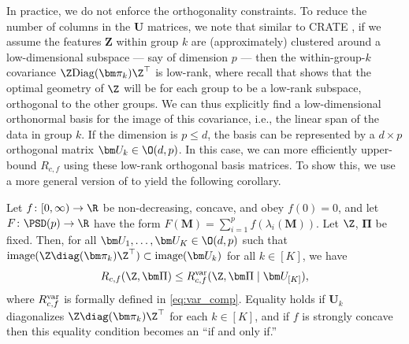 \documentclass[../../book-main.tex]{subfiles}
\begin{document}
In practice, we do not enforce the orthogonality constraints. To
reduce the number of columns in the $\bm U$ matrices, we note that
similar to CRATE \citep{yu2023white}, if we assume the features $\bm
Z$ within group \(k\) are (approximately) clustered around a
low-dimensional subspace --- say of dimension \(p\) --- then the
within-group-\(k\) covariance \(\Z\mathrm{Diag}(\bm
\pi_{k})\Z^{\top}\) is low-rank, where recall that
\cite{yu2020learning} shows that the optimal geometry of $\Z$ will be
for each group to be a low-rank subspace, orthogonal to the other
groups. We can thus explicitly find a low-dimensional orthonormal
basis for the image of this covariance, i.e., the linear span of the
data in group \(k\). If the dimension is $p \leq d$, the basis can be
represented by a $d\times p$ orthogonal matrix $\bm U_k \in \O(d,
p)$. In this case, we can more efficiently upper-bound \(R_{c,f}\)
using these low-rank orthogonal basis matrices. To show this, we use
a more general version of   to yield the
following corollary.
\begin{corollary}\label{cor:var_concave_logdet}
    Let \(f \colon [0, \infty) \to \R\) be non-decreasing, concave,
    and obey \(f(0) = 0\), and let \(F \colon \PSD(p) \to \R\) have
    the form \(F(\bm M) = \sum_{i = 1}^{p}f(\lambda_{i}(\bm M))\).
    Let \(\Z\), \(\bm \Pi\) be fixed. Then, for all \(\bm U_{1},
    \dots, \bm U_{K} \in \O(d, p)\) such that
    \(\mathrm{image}(\Z\diag(\bm \pi_{k})\Z^{\top}) \subset
    \mathrm{image}(\bm U_{k})\) for all \(k \in [K]\), we have
    \begin{equation}
        R_{c, f}(\Z, \bm\Pi) \leq R_{c, f}^{\rm var}(\Z, \bm\Pi \mid
        \bm U_{[K]}),
    \end{equation}
    where \(R_{c, f}^{\rm var}\) is formally defined in
    \eqref{eq:var_comp}. Equality holds if \(\bm U_{k}\) diagonalizes
    \(\Z\diag(\bm \pi_{k})\Z^{\top}\) for each \(k \in [K]\), and if
    \(f\) is strongly concave then this equality condition becomes an
    ``if and only if.''
\end{corollary}
\end{document}

